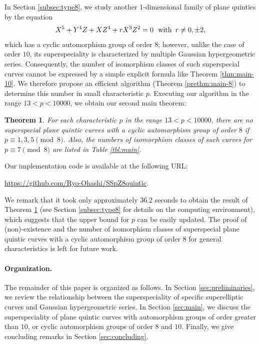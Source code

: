 \documentclass[10pt,a4paper]{amsart}
\newtheorem{Thm}[Def]{Theorem}
\begin{document}
\noindent In Section \ref{subsec:type8}, we study another 1-dimensional family of plane quintics by the equation\vspace{-0.5mm}
\[
    X^5+Y^4Z+XZ^4+rX^3Z^2 = 0 \ \text{ with }\,r \neq 0,\pm 2,\vspace{0.5mm}
\]
which has a cyclic automorphism group of order $8$; \hspace{0.5mm}however, unlike the case of order $10$, its superspeciality is characterized by multiple Gaussian hypergeometric series.
Consequently, the number of isomorphism classes of such superspecial curves cannot be expressed by a simple explicit formula like Theorem \ref{thm:main-10}.
We therefore propose an efficient algorithm (Theorem \ref{prethm:main-8}) to determine this number in small characteristic $p$.
Executing our algorithm in the range $13 < p < 10000$, we obtain our second main theorem:\vspace{-0.8mm}
\begin{Thm}\label{thm:main-8}
For each characteristic $p$ in the range $13 < p < 10000$, there are no superspecial plane quintic curves with a cyclic automorphism group of order $8$ if $p \equiv 1,3,5 \pmod{8}$.
Also, the numbers of isomorphism classes of such curves for $p \equiv 7 \pmod{8}$ are listed in Table \ref{tbl:main}.
\end{Thm}
\noindent Our implementation code is available at the following URL:\vspace{0.5mm}
\begin{center}
    \url{https://github.com/Ryo-Ohashi/SSpZ8quintic}.\vspace{1.3mm}
\end{center}
We remark that it took only approximately 36.2 seconds to obtain the result of Theorem \ref{thm:main-8} (see Section \ref{subsec:type8} for details on the computing environment), which suggests that the upper bound for $p$ can be easily updated.
The proof of (non)-existence and the number of isomorphism classes of superspecial plane quintic curves with a cyclic automorphism group of order $8$ for general characteristics is left for future work.\vspace{-2.8mm}

\paragraph{Organization.} The remainder of this paper is organized as follows.
In Section \ref{sec:preliminaries}, we review the relationship between the superspeciality of specific superelliptic curves and Gaussian hypergeometric series.
In Section \ref{sec:main}, we discuss the superspeciality of plane quintic curves with automorphism groups of order greater than $10$, or cyclic automorphism groups of order $8$ and $10$.
Finally, we give concluding remarks in Section \ref{sec:concluding}.\vspace{-2.8mm}
\end{document}
